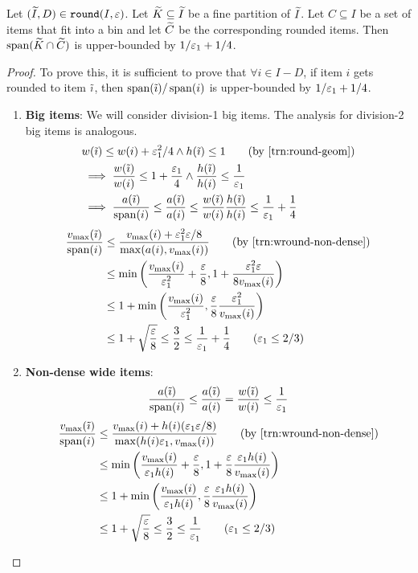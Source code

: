 \begin{lemma}
Let $(\widetilde{I}, D) \in \operatorname{\mathtt{round}}(I, \varepsilon)$.
Let $\widetilde{K} \subseteq \widetilde{I}$ be a fine partition of $\widetilde{I}$.
Let $C \subseteq I$ be a set of items that fit into a bin
and let $\widetilde{C}$ be the corresponding rounded items.
Then $\operatorname{span}(\widetilde{K} \cap \widetilde{C})$ is upper-bounded by
$1/\varepsilon_1 + 1/4$.
\end{lemma}
\begin{proof}
To prove this, it is sufficient to prove that $\forall i \in I-D$, if item $i$
gets rounded to item $\tilde{\imath}$, then $\operatorname{span}(\tilde{\imath})/\operatorname{span}(i)$ is upper-bounded by
$1/\varepsilon_1 + 1/4$.

\begin{enumerate}
\item \textbf{Big items}: We will consider division-1 big items.
The analysis for division-2 big items is analogous.
\begin{align*}
& w(\itild) \le w(i) + \epsLarge^2/4 \wedge h(\itild) \le 1
\tag{by \cref{trn:round-geom}}
\\ &\implies \frac{w(\itild)}{w(i)} \le 1 + \frac{\epsLarge}{4}
\wedge \frac{h(\itild)}{h(i)} \le \frac{1}{\epsLarge}
\\ &\implies \frac{a(\itild)}{\Span(i)} \le \frac{a(\itild)}{a(i)}
    \le \frac{w(\itild)}{w(i)}\frac{h(\itild)}{h(i)}
    \le \frac{1}{\epsLarge} + \frac{1}{4}
\end{align*}
\begin{align*}
\frac{v_{\max}(\itild)}{\Span(i)}
&\le \frac{v_{\max}(i) + \epsLarge^2\eps/8}{\max(a(i), v_{\max}(i))}
\tag{by \cref{trn:wround-non-dense}}
\\ &\le \min\left(\frac{v_{\max}(i)}{\epsLarge^2} + \frac{\eps}{8},
    1 + \frac{\epsLarge^2\eps}{8v_{\max}(i)}\right)
\\ &\le 1 + \min\left(\frac{v_{\max}(i)}{\epsLarge^2},
    \frac{\eps}{8}\frac{\epsLarge^2}{v_{\max}(i)}\right)
\\ &\le 1 + \sqrt{\frac{\eps}{8}} \le \frac{3}{2}
\le \frac{1}{\epsLarge} + \frac{1}{4}
\tag{$\epsLarge \le 2/3$}
\end{align*}

\item \textbf{Non-dense wide items}:
\[ \frac{a(\tilde{\imath})}{\operatorname{span}(i)} \le \frac{a(\tilde{\imath})}{a(i)}
= \frac{w(\tilde{\imath})}{w(i)} \le \frac{1}{\varepsilon_1} \]
\begin{align*}
\frac{v_{\max}(\itild)}{\Span(i)}
&\le \frac{v_{\max}(i) + h(i)(\epsLarge\eps/8)}{\max(h(i)\epsLarge, v_{\max}(i))}
\tag{by \cref{trn:wround-non-dense}}
\\ &\le \min\left(\frac{v_{\max}(i)}{\epsLarge h(i)} + \frac{\eps}{8},
    1 + \frac{\eps}{8} \frac{\epsLarge h(i)}{v_{\max}(i)} \right)
\\ &\le 1 + \min\left(\frac{v_{\max}(i)}{\epsLarge h(i)},
    \frac{\eps}{8} \frac{\epsLarge h(i)}{v_{\max}(i)} \right)
\\ &\le 1 + \sqrt{\frac{\eps}{8}} \le \frac{3}{2} \le \frac{1}{\epsLarge}
\tag{$\epsLarge \le 2/3$}
\end{align*}


\end{enumerate}
\end{proof}
